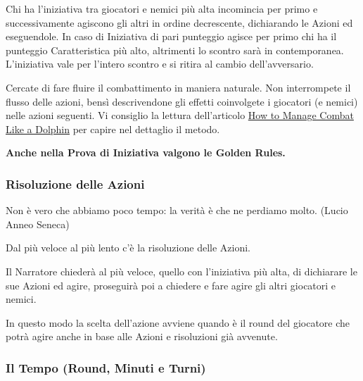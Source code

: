 \begin{multicols}{2}
Chi ha l'iniziativa tra giocatori e nemici più alta incomincia per primo e successivamente agiscono gli altri in ordine decrescente, dichiarando le Azioni ed eseguendole. In caso di Iniziativa di pari punteggio agisce per primo chi ha il punteggio Caratteristica più alto, altrimenti lo scontro sarà in contemporanea. L'iniziativa vale per l'intero scontro e si ritira al cambio dell'avversario.

\begin{narratore} %
Cercate di fare fluire il combattimento in maniera naturale. Non interrompete il flusso delle azioni, bensì descrivendone gli effetti coinvolgete i giocatori (e nemici) nelle azioni seguenti. Vi consiglio la lettura dell'articolo \href{https://theangrygm.com/manage-combat-like-a-dolphin/}{How to Manage Combat Like a Dolphin} per capire nel dettaglio il metodo.
\end{narratore}

\textbf{Anche nella Prova di Iniziativa valgono le Golden Rules.}

\subsubsection{Risoluzione delle Azioni}\label{risoluzionedelleazioni}

\begin{enfasi}{
Non è vero che abbiamo poco tempo: la verità è che ne perdiamo molto. (Lucio Anneo Seneca)
}
\end{enfasi}

Dal più veloce al più lento c'è la risoluzione delle Azioni.

Il Narratore chiederà al più veloce, quello con l'iniziativa più alta, di dichiarare le sue Azioni ed agire, proseguirà poi a chiedere e fare agire gli altri giocatori e nemici.

In questo modo la scelta dell'azione avviene quando è il round del giocatore che potrà agire anche in base alle Azioni e risoluzioni già avvenute.


\subsubsection{Il Tempo (Round, Minuti e Turni)}\label{iltempo}


\end{multicols}
